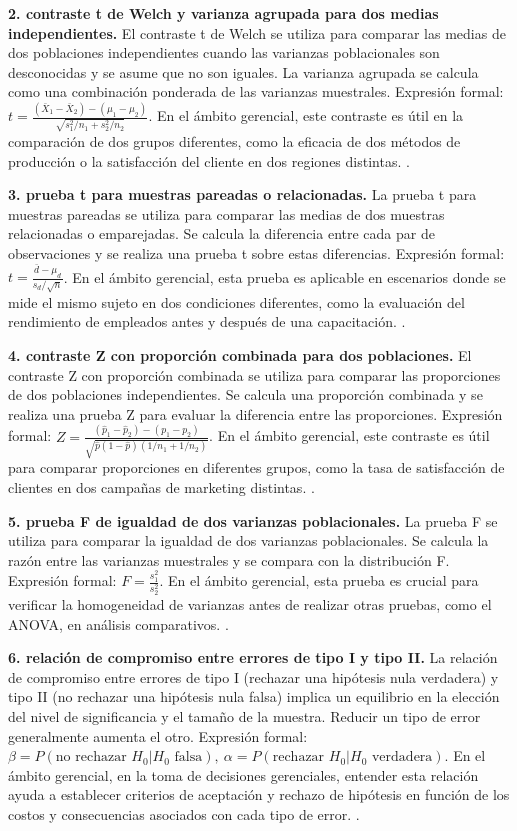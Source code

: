 {\textbf{2. contraste t de Welch y varianza agrupada para dos medias independientes.} El contraste t de Welch se utiliza para comparar las medias de dos poblaciones independientes cuando las varianzas poblacionales son desconocidas y se asume que no son iguales. La varianza agrupada se calcula como una combinación ponderada de las varianzas muestrales. Expresión formal: $t = \frac{(\bar{X}_1 - \bar{X}_2) - (\mu_1 - \mu_2)}{\sqrt{s_1^2/n_1 + s_2^2/n_2}}$. En el ámbito gerencial, este contraste es útil en la comparación de dos grupos diferentes, como la eficacia de dos métodos de producción o la satisfacción del cliente en dos regiones distintas. \citep{anderson2012,lind2012,wackerly2010}.

\textbf{3. prueba t para muestras pareadas o relacionadas.} La prueba t para muestras pareadas se utiliza para comparar las medias de dos muestras relacionadas o emparejadas. Se calcula la diferencia entre cada par de observaciones y se realiza una prueba t sobre estas diferencias. Expresión formal: $t = \frac{\bar{d} - \mu_d}{s_d/\sqrt{n}}$. En el ámbito gerencial, esta prueba es aplicable en escenarios donde se mide el mismo sujeto en dos condiciones diferentes, como la evaluación del rendimiento de empleados antes y después de una capacitación. \citep{anderson2012,lind2012,wackerly2010}.

\textbf{4. contraste Z con proporción combinada para dos poblaciones.} El contraste Z con proporción combinada se utiliza para comparar las proporciones de dos poblaciones independientes. Se calcula una proporción combinada y se realiza una prueba Z para evaluar la diferencia entre las proporciones. Expresión formal: $Z = \frac{(\hat{p}_1 - \hat{p}_2) - (p_1 - p_2)}{\sqrt{\hat{p}(1 - \hat{p})(1/n_1 + 1/n_2)}}$. En el ámbito gerencial, este contraste es útil para comparar proporciones en diferentes grupos, como la tasa de satisfacción de clientes en dos campañas de marketing distintas. \citep{anderson2012,lind2012,wackerly2010}.

\textbf{5. prueba F de igualdad de dos varianzas poblacionales.} La prueba F se utiliza para comparar la igualdad de dos varianzas poblacionales. Se calcula la razón entre las varianzas muestrales y se compara con la distribución F. Expresión formal: $F = \frac{s_1^2}{s_2^2}$. En el ámbito gerencial, esta prueba es crucial para verificar la homogeneidad de varianzas antes de realizar otras pruebas, como el ANOVA, en análisis comparativos. \citep{anderson2012,lind2012,wackerly2010}.

\textbf{6. relación de compromiso entre errores de tipo I y tipo II.} La relación de compromiso entre errores de tipo I (rechazar una hipótesis nula verdadera) y tipo II (no rechazar una hipótesis nula falsa) implica un equilibrio en la elección del nivel de significancia y el tamaño de la muestra. Reducir un tipo de error generalmente aumenta el otro. Expresión formal: $\beta = P(\text{no rechazar } H_0 | H_0 \text{ falsa}), \ \alpha = P(\text{rechazar } H_0 | H_0 \text{ verdadera})$. En el ámbito gerencial, en la toma de decisiones gerenciales, entender esta relación ayuda a establecer criterios de aceptación y rechazo de hipótesis en función de los costos y consecuencias asociados con cada tipo de error. \citep{anderson2012,lind2012,wackerly2010}.

}
